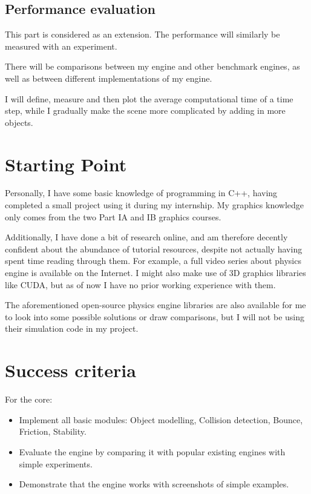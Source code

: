 \documentclass[12pt]{article}
\begin{document}
\subsection{Performance evaluation}

This part is considered as an extension. The performance will similarly be measured with an experiment.

There will be comparisons between my engine and other benchmark engines, 
as well as between different implementations of my engine.

I will define, measure and then plot the average computational time of a time step, while
I gradually make the scene more complicated by adding in more objects.

\section{Starting Point}

Personally, I have some basic knowledge of programming in C++, having completed a small project using it during my internship.
My graphics knowledge only comes from the two Part IA and IB graphics courses.

Additionally, I have done a bit of research online, 
and am therefore decently confident about the abundance of tutorial resources, 
despite not actually having spent time reading through them.
For example, a full video series about physics engine is available on the Internet\cite{tutorialyt}.
I might also make use of 3D graphics libraries like CUDA\cite{cuda}, but as of now I have no prior working experience with them.

The aforementioned open-source physics engine libraries are also available for me to look into some possible solutions or draw comparisons, 
but I will not be using their simulation code in my project.

\section{Success criteria}

For the core:

\begin{itemize}
\item Implement all basic modules: Object modelling, Collision detection, Bounce, Friction, Stability.

\item Evaluate the engine by comparing it with popular existing engines with simple experiments.

\item Demonstrate that the engine works with screenshots of simple examples.
\end{itemize}
\end{document}
